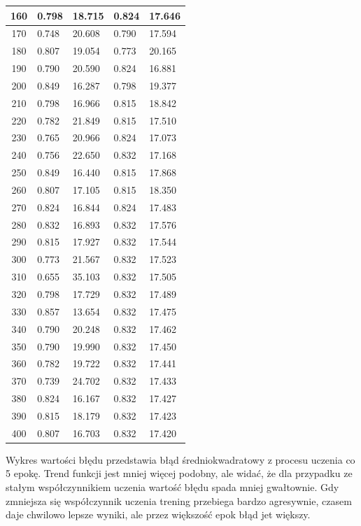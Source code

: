 \begin{longtable}{|c|l|l|l|l|}
        160 & 0.798 & 18.715 & 0.824 & 17.646 \\ \hline
        170 & 0.748 & 20.608 & 0.790 & 17.594 \\ \hline
        180 & 0.807 & 19.054 & 0.773 & 20.165 \\ \hline
        190 & 0.790 & 20.590 & 0.824 & 16.881 \\ \hline
        200 & 0.849 & 16.287 & 0.798 & 19.377 \\ \hline
        210 & 0.798 & 16.966 & 0.815 & 18.842 \\ \hline
        220 & 0.782 & 21.849 & 0.815 & 17.510 \\ \hline
        230 & 0.765 & 20.966 & 0.824 & 17.073 \\ \hline
        240 & 0.756 & 22.650 & 0.832 & 17.168 \\ \hline
        250 & 0.849 & 16.440 & 0.815 & 17.868 \\ \hline
        260 & 0.807 & 17.105 & 0.815 & 18.350 \\ \hline
        270 & 0.824 & 16.844 & 0.824 & 17.483 \\ \hline
        280 & 0.832 & 16.893 & 0.832 & 17.576 \\ \hline
        290 & 0.815 & 17.927 & 0.832 & 17.544 \\ \hline
        300 & 0.773 & 21.567 & 0.832 & 17.523 \\ \hline
        310 & 0.655 & 35.103 & 0.832 & 17.505 \\ \hline
        320 & 0.798 & 17.729 & 0.832 & 17.489 \\ \hline
        330 & 0.857 & 13.654 & 0.832 & 17.475 \\ \hline
        340 & 0.790 & 20.248 & 0.832 & 17.462 \\ \hline
        350 & 0.790 & 19.990 & 0.832 & 17.450 \\ \hline
        360 & 0.782 & 19.722 & 0.832 & 17.441 \\ \hline
        370 & 0.739 & 24.702 & 0.832 & 17.433 \\ \hline
        380 & 0.824 & 16.167 & 0.832 & 17.427 \\ \hline
        390 & 0.815 & 18.179 & 0.832 & 17.423 \\ \hline
        400 & 0.807 & 16.703 & 0.832 & 17.420 \\ \hline
    \end{longtable}

    Wykres wartości błędu przedstawia błąd średniokwadratowy z procesu uczenia co 5 epokę.
    Trend funkcji jest mniej więcej podobny, ale widać, że dla przypadku ze stałym współczynnikiem uczenia wartość błędu spada mniej gwałtownie.
    Gdy zmniejsza się współczynnik uczenia trening przebiega bardzo agresywnie, czasem daje chwilowo lepsze wyniki, ale przez większość epok błąd jet większy.

